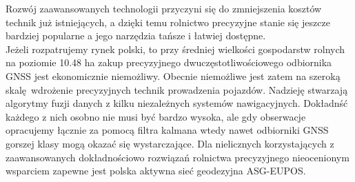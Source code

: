 Rozwój zaawansowanych technologii przyczyni się do zmniejszenia kosztów technik już istniejących, a dzięki temu rolnictwo precyzyjne stanie się jeszcze bardziej 
popularne a jego narzędzia tańsze i łatwiej dostępne.\\
\indent Jeżeli rozpatrujemy rynek polski, to przy średniej wielkości gospodarstw rolnych na poziomie 10.48 ha \cite[]{ARIMR} zakup 
precyzyjnego dwuczęstotliwościowego odbiornika GNSS jest ekonomicznie niemożliwy. Obecnie niemożliwe jest zatem na szeroką skalę wdrożenie precyzyjnych technik 
prowadzenia pojazdów. Nadzieję stwarzają algorytmy fuzji danych z kilku niezależnych systemów nawigacyjnych. Dokładnść każdego z nich osobno nie musi być bardzo wysoka,
ale gdy obserwacje opracujemy łącznie za pomocą filtra kalmana wtedy nawet odbiorniki GNSS gorszej klasy mogą okazać się wystarczające.
Dla nielicznych korzystających z zaawansowanych dokładnościowo rozwiązań rolnictwa precyzyjnego nieocenionym wsparciem zapewne jest polska aktywna sieć 
geodezyjna ASG-EUPOS.

